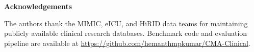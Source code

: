 \documentclass[11pt]{article}
\begin{document}
\begin{center}
    \Large\textbf{Acknowledgements}
\end{center}
\vspace{1em}

The authors thank the MIMIC, eICU, and HiRID data teams for maintaining publicly available clinical research databases. Benchmark code and evaluation pipeline are available at \url{https://github.com/hemanthmpkumar/CMA-Clinical}.
\end{document}
